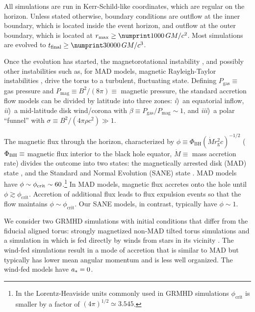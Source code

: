 All simulations are run in Kerr-Schild-like coordinates, which are regular on the horizon.
Unless stated otherwise, boundary conditions are outflow at the inner boundary, which is located inside the event horizon, and outflow at the outer boundary, which is located at $r_{\rm max} \ge \no{1000}\,\rg$.
Most simulations are evolved to $t_\mathrm{final} \ge  \no{30000}\,\tg$.

Once the evolution has started, the magnetorotational instability \citep[MRI,][]{1992ApJ...400..610B}, and possibly other instabilities such as, for MAD models,  magnetic Rayleigh-Taylor instabilities \citep{2018MNRAS.478.1837M}, drive the torus to a turbulent, fluctuating state.
Defining $P_\mathrm{gas} \equiv$ gas pressure and $P_\mathrm{mag} \equiv B^2 / (8\pi) \equiv$ magnetic pressure, the standard accretion flow models can be divided by latitude into three zones:
\emph{i})~an equatorial inflow,
\emph{ii})~a mid-latitude disk wind/corona with  $\beta  \equiv P_\mathrm{gas} / P_\mathrm{mag} \sim 1$, and
\emph{iii})~a polar ``funnel'' with $\sigma \equiv B^2/(4\pi \rho c^2) \gg 1$.

The magnetic flux through the horizon, characterized by $\phi \equiv \Phi_{\mathrm{BH}} (\dot{M} r_\mathrm{g}^2 c)^{-1/2}$ ($\Phi_{\rm BH} \equiv$ magnetic flux interior to the black hole equator, $\dot{M} \equiv$ mass accretion rate) divides the outcome into two states:
the magnetically arrested disk (MAD) state \citep[e.g.,][]{1974Ap&SS..28...45B, 2003ApJ...592.1042I, 2003PASJ...55L..69N, 2011MNRAS.418L..79T},
and the Standard and Normal Evolution (SANE) state \citep[e.g.,][]{2003ApJ...589..444G, 2003ApJ...599.1238D, 2012MNRAS.426.3241N}.
MAD models have $\phi \sim \phi_{\rm crit} \sim 60$.\footnote{In the Lorentz-Heaviside units commonly used in GRMHD simulations $\phi_\mathrm{crit}$ is smaller by a factor of $(4\pi)^{1/2} \simeq 3.545$.}
In MAD models, magnetic flux accretes onto the hole until $\phi \gtrsim \phi_\mathrm{crit}$.  Accretion of additional flux leads to flux expulsion events so that the flow maintains $\phi \sim \phi_\mathrm{crit}$.  Our SANE models, in contrast, typically have $\phi \sim 1$.

We consider two GRMHD simulations with initial conditions that differ from the fiducial aligned torus: strongly magnetized non-MAD tilted torus simulations \citep{Liska2018, Chatterjee2020} and a simulation in which \sgra is fed directly by winds from stars in its vicinity \citep{2020ApJ...896L...6R}.
The wind-fed simulations result in a mode of accretion that is similar to MAD but typically has lower mean angular momentum and is less well organized.
The wind-fed models have $a_* = 0$.

